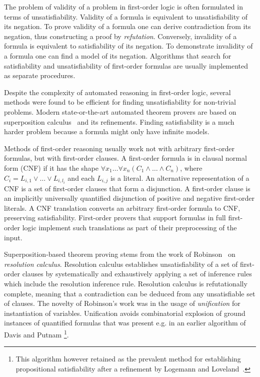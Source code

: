 The problem of validity of a problem in first-order logic is often formulated in terms of unsatisfiability. Validity of a formula is equivalent to unsatisfiability of its negation. To prove validity of a formula one can derive contradiction from its negation, thus constructing a proof by \emph{refutation}. Conversely, invalidity of a formula is equivalent to satisfiability of its negation. To demonstrate invalidity of a formula one can find a model of its negation. Algorithms that search for satisfiability and unsatisfiability of first-order formulas are usually implemented as separate procedures.

Despite the complexity of automated reasoning in first-order logic, several methods were found to be efficient for finding unsatisfiability for non-trivial problems. Modern state-or-the-art automated theorem provers are based on superposition calculus~\cite{NieuwenhuisRubio:HandbookAR:paramodulation:2001} and its refinements. Finding satisfiability is a much harder problem because a formula might only have infinite models.\iffalse In practice, the search for satisfiability is limited to finite models.\fi

Methods of first-order reasoning usually work not with arbitrary first-order formulas, but with first-order clauses. A first-order formula is in clausal normal form (CNF) if it has the shape $\forall x_1\ldots\forall x_n(C_1\wedge\ldots\wedge C_n)$, where $C_i = L_{i,1}\vee\ldots\vee L_{i,l_i}$ and each $L_{i,j}$ is a literal. An alternative representation of a CNF is a set of first-order clauses that form a disjunction. A first-order clause is an implicitly universally quantified disjunction of positive and negative first-order literals. A CNF translation converts an arbitrary first-order formula to CNF, preserving satisfiability. First-order provers that support formulas in full first-order logic implement such translations as part of their preprocessing of the input.

Superposition-based theorem proving stems from the work of Robinson~\cite{Robinson65} on \emph{resolution calculus}. Resolution calculus establishes unsatisfiability of a set of first-order clauses by systematically and exhaustively applying a set of inference rules which include the resolution inference rule. Resolution calculus is refutationally complete, meaning that a contradiction can be deduced from any unsatisfiable set of clauses. The novelty of Robinson's work was in the usage of \emph{unification} for instantiation of variables. Unification avoids combinatorial explosion of ground instances of quantified formulas that was present e.g. in an earlier algorithm of Davis and Putnam \cite{davis1960computing}\footnote{This algorithm however retained as the prevalent method for establishing propositional satisfiability after a refinement by Logemann and Loveland~\cite{davis1962machine}.}.

